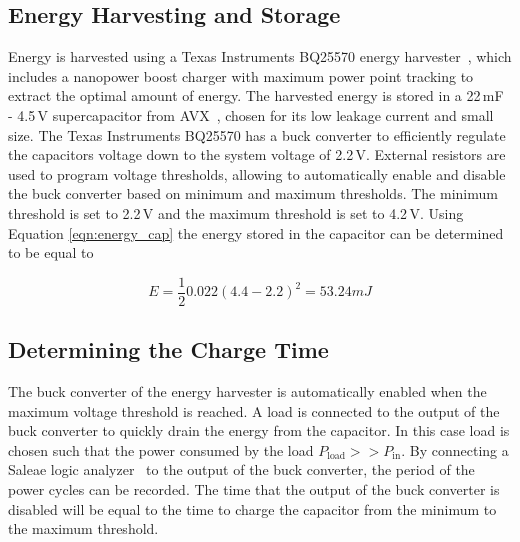 \subsection{Energy Harvesting and Storage}
\label{sec:pre_energy_harvesting_storage}
Energy is harvested using a Texas Instruments BQ25570 energy harvester~\cite{bq25570_2017}, which includes a nanopower boost charger with maximum power point tracking to extract the optimal amount of energy. 
The harvested energy is stored in a 22\,mF - 4.5\,V supercapacitor from AVX~\cite{avx_bestcap_2017}, chosen for its low leakage current and small size.
The Texas Instruments BQ25570 has a buck converter to efficiently regulate the capacitors voltage down to the system voltage of 2.2\,V.
External resistors are used to program voltage thresholds, allowing to automatically enable and disable the buck converter based on minimum and maximum thresholds.
The minimum threshold is set to 2.2\,V and the maximum threshold is set to 4.2\,V.
Using Equation \ref{eqn:energy_cap} the energy stored in the capacitor can be determined to be equal to

\begin{equation}
\label{eq:cap2}
E = \frac{1}{2} 0.022 (4.4 - 2.2)^2 = 53.24 mJ
\end{equation}


\subsection{Determining the Charge Time}

The buck converter of the energy harvester is automatically enabled when the maximum voltage threshold is reached.
A load is connected to the output of the buck converter to quickly drain the energy from the capacitor.
In this case load is chosen such that the power consumed by the load $P_{\text{load}} >> P_{\text{in}}$.
By connecting a Saleae logic analyzer~\cite{saleae_2017} to the output of the buck converter, the period of the power cycles can be recorded.
The time that the output of the buck converter is disabled will be equal to the time to charge the capacitor from the minimum to the maximum threshold.

